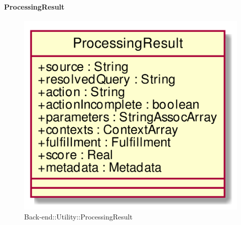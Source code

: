 \hypertarget{ProcessingResult_label}{\paragraph{ProcessingResult}}
\begin{figure}[h]
	\centering
	\includegraphics[width=\textwidth,height=\textheight,keepaspectratio]{images/ClassProcessingResult.png}
	\caption{Back-end::Utility::ProcessingResult}
\end{figure}
